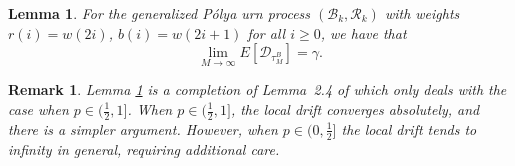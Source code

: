 \documentclass[twoside,12pt,a4paper]{article}
\newtheorem{lemma}{Lemma}[section]
\newtheorem{remark}{Remark}[section]
\numberwithin{equation}{section}
\begin{document}
		\begin{lemma} \label{lm: convergence of mean of discrepancies}
			For the generalized P\'{o}lya urn process $(\mathcal{B}_{k},\mathcal{R}_{k})$ with weights $r(i)= w(2i)$, $b(i) = w(2i+1)$ for all $i\geq 0$, we have that
			$$
			\lim_{M\to\infty} E[\mathcal{D}_{\tau_M^B}] = \gamma. 
			$$
		\end{lemma} 
		\begin{remark}
			Lemma \ref{lm: convergence of mean of discrepancies} is a completion of Lemma~2.4 of \cite{KMP22} which only deals with the case when ${p \in (\frac{1}{2}, 1]}$. When $p \in (\frac{1}{2}, 1]$, the local drift converges absolutely, and there is a simpler argument. However, when $p \in (0,\frac{1}{2}]$ the local drift tends to infinity in general, requiring additional care.
		\end{remark}
\end{document}
